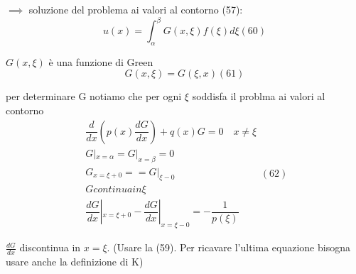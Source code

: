 \documentclass[a4paper,11pt]{report}
\begin{document}
$\implies$ soluzione del problema ai valori al contorno (57):
\begin{equation}
u(x)=\int_\alpha^\beta G(x,\xi)f(\xi)d\xi (60)
\end{equation}

$G(x,\xi)$ è una funzione di Green
\begin{equation}
G(x,\xi)=G(\xi,x) (61)
\end{equation}


per determinare G notiamo che per ogni $\xi$ soddisfa il problma ai valori al contorno
\begin{equation}
\begin{matrix}
\dfrac{d}{dx}\left(p(x)\dfrac{dG}{dx}\right) + q(x)G = 0 \quad x\neq \xi \\
G|_{x=\alpha}=G|_{x=\beta}=0 \\
G_{x=\xi+0}==G|_{\xi-0} \\
G continua in \xi \\
\dfrac{dG}{dx}|_{x=\xi+0}-\dfrac{dG}{dx}|_{x=\xi-0}=-\dfrac{1}{p(\xi)}
\end{matrix} (62)
\end{equation}


$\frac{dG}{dx}$ discontinua in $x=\xi$. (Usare la (59). Per ricavare l'ultima equazione bisogna usare anche la definizione di K)
\end{document}
